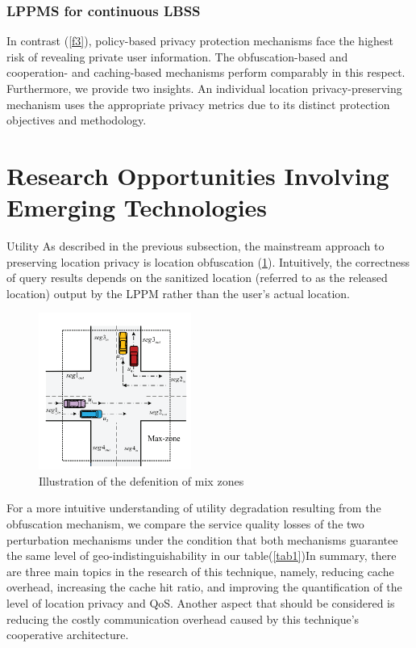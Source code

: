 \documentclass{opticajnl}
\begin{document}
\subsubsection{LPPMS for continuous LBSS}
In contrast (\ref{f3}), policy-based privacy protection mechanisms face the highest risk of revealing private user information. The obfuscation-based and cooperation- and caching-based mechanisms perform comparably in this respect. Furthermore, we provide two insights. An individual location privacy-preserving mechanism uses the appropriate privacy metrics due to its distinct protection objectives and methodology.
\section{Research Opportunities Involving Emerging Technologies}
Utility As described in the previous subsection, the mainstream approach to preserving location privacy is location obfuscation (\ref{2}). Intuitively, the correctness of query results depends on the sanitized location (referred to as the released location) output by the LPPM rather than the user’s actual location.
\begin{figure}[H]
    \centering
    \includegraphics[width=50mm]{il.png}
    \caption{Illustration of the defenition of mix zones}
    \label{2}
\end{figure}
For a more intuitive understanding of utility degradation resulting from the obfuscation mechanism, we compare the service quality losses of the two perturbation mechanisms under the condition that both mechanisms guarantee the same level of geo-indistinguishability in our table(\ref{tab1})In summary, there are three main topics in the research of this technique, namely, reducing cache overhead, increasing the cache hit ratio, and improving the quantification of the level of location privacy and QoS. Another aspect that should be considered is reducing the costly communication overhead caused by this technique’s cooperative architecture.
\end{document}
